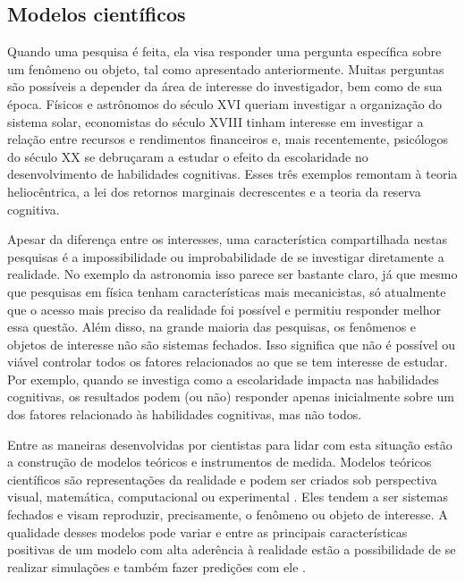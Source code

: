 \documentclass[
]{book}
\begin{document}
\hypertarget{modelos-cientuxedficos}{%
\subsection{Modelos científicos}\label{modelos-cientuxedficos}}

Quando uma pesquisa é feita, ela visa responder uma pergunta específica sobre um fenômeno ou objeto, tal como apresentado anteriormente. Muitas perguntas são possíveis a depender da área de interesse do investigador, bem como de sua época. Físicos e astrônomos do século XVI queriam investigar a organização do sistema solar, economistas do século XVIII tinham interesse em investigar a relação entre recursos e rendimentos financeiros e, mais recentemente, psicólogos do século XX se debruçaram a estudar o efeito da escolaridade no desenvolvimento de habilidades cognitivas. Esses três exemplos remontam à teoria heliocêntrica, a lei dos retornos marginais decrescentes e a teoria da reserva cognitiva.

Apesar da diferença entre os interesses, uma característica compartilhada nestas pesquisas é a impossibilidade ou improbabilidade de se investigar diretamente a realidade. No exemplo da astronomia isso parece ser bastante claro, já que mesmo que pesquisas em física tenham características mais mecanicistas, só atualmente que o acesso mais preciso da realidade foi possível e permitiu responder melhor essa questão. Além disso, na grande maioria das pesquisas, os fenômenos e objetos de interesse não são sistemas fechados. Isso significa que não é possível ou viável controlar todos os fatores relacionados ao que se tem interesse de estudar. Por exemplo, quando se investiga como a escolaridade impacta nas habilidades cognitivas, os resultados podem (ou não) responder apenas inicialmente sobre um dos fatores relacionado às habilidades cognitivas, mas não todos.

Entre as maneiras desenvolvidas por cientistas para lidar com esta situação estão a construção de modelos teóricos e instrumentos de medida. Modelos teóricos científicos são representações da realidade e podem ser criados sob perspectiva visual, matemática, computacional ou experimental \citep{Weisberg2013}. Eles tendem a ser sistemas fechados e visam reproduzir, precisamente, o fenômeno ou objeto de interesse. A qualidade desses modelos pode variar e entre as principais características positivas de um modelo com alta aderência à realidade estão a possibilidade de se realizar simulações e também fazer predições com ele \citep{Heidemann2016}.
\end{document}

